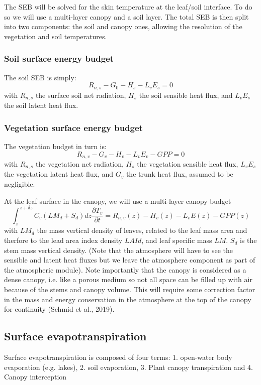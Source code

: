 \documentclass{article}
\begin{document}
 The SEB will be solved for the skin temperature at the leaf/soil interface. To do so we will use a multi-layer canopy and a soil layer.
 The total SEB is then split into two components: the soil and canopy ones, allowing the resolution of the vegetation and soil temperatures.
 
\subsubsection{Soil surface energy budget}
The soil SEB is simply:
\begin{equation}
     R_{n,s} - G_0 - H_s - L_vE_s = 0  
     \label{SEB:soil}
\end{equation}
with $R_{n,s}$ the surface soil net radiation, $H_s$ the soil sensible heat flux, and $L_vE_s$ the soil latent heat flux.

\subsubsection{Vegetation surface energy budget}
The vegetation budget in turn is:
\begin{equation}
     R_{n,v} - G_v - H_v - L_vE_v - GPP = 0  
     \label{SEB:veg}
\end{equation}
with $R_{n,s}$ the vegetation net radiation, $H_s$ the vegetation sensible heat flux, $L_vE_s$ the vegetation latent heat flux, and $G_v$ the trunk heat flux, assumed to be negligible. 

At the leaf surface in the canopy, we will use a multi-layer canopy budget
\begin{equation}
    \int_z^{z+\delta z}{C_v (LM_d+S_d) dz\frac{\partial T_v}{\partial t}} = R_{n,v}(z) -H_v(z)-L_vE(z)-GPP(z)
\end{equation}
with $LM_d$ the mass vertical density of leaves, related to the leaf mass area and therfore to the lead area index density $LAId$, and leaf specific mass $LM$. $S_d$ is the stem mass vertical density.
(Note that the atmosphere will have to see the sensible and latent heat fluxes but we leave the atmosphere component as part of the atmospheric module). Note importantly that the canopy is considered as a dense canopy, i.e. like a porous medium so not all space can be filled up with air because of the stems and canopy volume. This will require some correction factor in the mass and energy conservation in the atmosphere at the top of the canopy for continuity (Schmid et al., 2019).

\subsection{Surface evapotranspiration}
Surface evapotranspiration is composed of four terms: 1. open-water body evaporation (e.g. lakes), 2. soil evaporation, 3. Plant canopy transpiration and 4. Canopy interception
\end{document}
